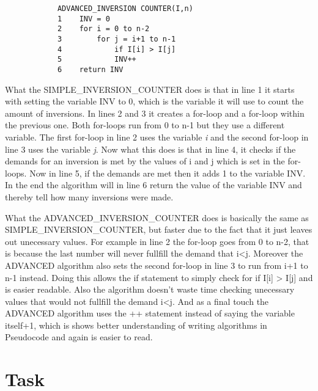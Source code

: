 \documentclass[a4paper]{article}
\begin{document}
        \begin{verbatim}
            ADVANCED_INVERSION COUNTER(I,n)
            1    INV = 0
            2    for i = 0 to n-2
            3        for j = i+1 to n-1
            4            if I[i] > I[j]
            5            INV++
            6    return INV
        \end{verbatim}   

        \begin{flushleft}
        What the SIMPLE\_INVERSION\_COUNTER does is that in line 1 it starts with setting the variable INV to 0, which is the variable 
        it will use to count the amount of inversions. In lines 2 and 3 it creates a for-loop and a for-loop within the previous one. 
        Both for-loops run from 0 to n-1 but they use a different variable. The first for-loop in line 2 uses the variable 
        \emph{i} and the second for-loop in line 3 uses the variable \emph{j}. Now what this does is that in line 4, it checks if 
        the demands for an inversion is met by the values of i and j which is set in the for-loops. Now in line 5, if the demands are 
        met then it adds 1 to the variable INV. In the end the algorithm will in line 6 return the value of the variable  INV and thereby
        tell how many inversions were made.
        \linebreak[1]

        What the ADVANCED\_INVERSION\_COUNTER does is basically the same as SIMPLE\_INVERSION\_COUNTER, but faster due to the fact that 
        it just leaves out unecessary values. For example in line 2 the for-loop goes from 0 to n-2, that is because the last number will 
        never fullfill the demand that i<j. Moreover the ADVANCED algorithm also sets the second for-loop in line 3 to run from i+1 to n-1 
        instead. Doing this allows the if statement to simply check for if I[i] > I[j] and is easier readable. Also the algorithm doesn't 
        waste time checking unecessary values that would not fullfill the demand i<j. And as a final touch the ADVANCED algorithm uses the
        ++ statement instead of saying the variable itself+1, which is shows better understanding of writing algorithms in Pseudocode
        and again is easier to read. 
        \end{flushleft}

    \newpage
    \section*{Task }
\end{document}
